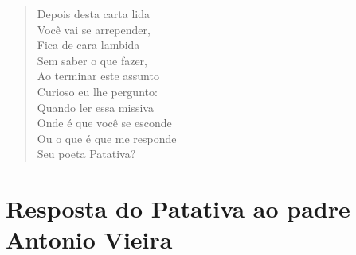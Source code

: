 \begin{verse}
Depois desta carta lida\\
Você vai se arrepender,\\
Fica de cara lambida\\
Sem saber o que fazer,\\
Ao terminar este assunto\\
Curioso eu lhe pergunto:\\
Quando ler essa missiva\\
Onde é que você se esconde\\
Ou o que é que me responde\\
Seu poeta Patativa?
\end{verse}

\chapter{Resposta do Patativa ao padre Antonio Vieira}


